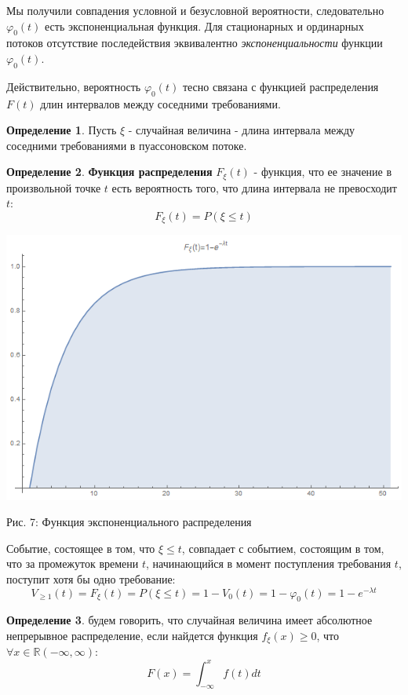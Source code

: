 \documentclass[aps,%
12pt,%
final,%
oneside,
onecolumn,%
musixtex, %
superscriptaddress,%
centertags]{article} %
\theoremstyle{plain}
\theoremstyle{definition}
\newtheorem{definition}{Определение}[subsection]
\theoremstyle{remark}
\begin{document}
Мы получили совпадения условной и безусловной вероятности, следовательно $\varphi_0(t)$ есть экспоненциальная функция. Для стационарных и ординарных потоков отсутствие последействия эквивалентно \textit{экспоненциальности} функции $\varphi_0(t)$.

Действительно, вероятность $\varphi_0(t)$ тесно связана с функцией распределения $F(t)$ длин интервалов между соседними требованиями.

\begin{definition}
	Пусть $\xi$ - случайная величина - длина интервала между соседними требованиями в пуассоновском потоке.
\end{definition}

\begin{definition}
	\textbf{Функция распределения} $F_{\xi}(t)$ - функция, что ее значение в произвольной точке $t$ есть вероятность того, что длина интервала не превосходит $t$:
	$$F_{\xi}(t) = P(\xi \leq t)$$
\end{definition}

\begin{center}
  \includegraphics[scale=0.6]{images/7.png}

  Рис. 7: Функция экспоненциального распределения
\end{center}

Событие, состоящее в том, что $\xi \leq t$, совпадает с событием, состоящим в том, что за промежуток времени $t$, начинающийся в момент поступления требования $t$, поступит хотя бы одно требование:
$$V_{\geq 1}(t) = F_{\xi}(t) = P(\xi \leq t) = 1 -V_0(t) = 1-\varphi_0(t) = 1 - e^{-\lambda t}$$

\begin{definition}
	будем говорить, что случайная величина имеет абсолютное непрерывное распределение, если найдется функция $f_{\xi}(x) \geq 0$, что $\forall x \in \mathbb{R} (-\infty, \infty)$:
	$$F(x) = \int_{-\infty}^{x} f(t)dt$$
\end{definition}
\end{document}

